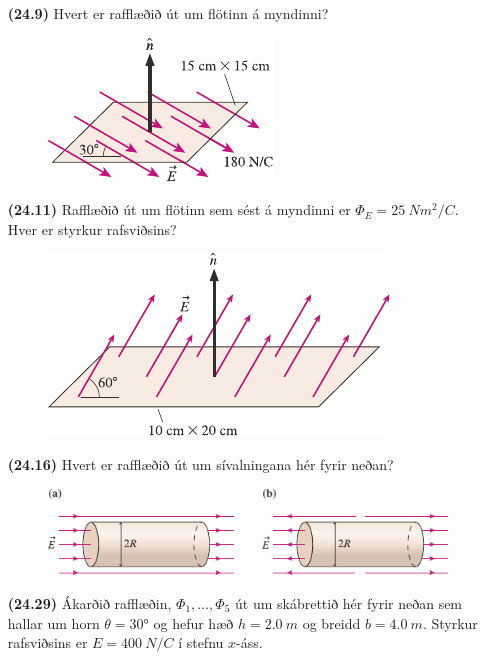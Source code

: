 \ifdefined \wholebook \else\documentclass[oneside]{book}\usepackage{EdlBook}\graphicspath{{figures/}}
\begin{document}
\begin{enumerate}[label = \textbf{(\alph*)}]

\item[\textbf{(24.9)}] Hvert er rafflæðið út um flötinn á myndinni?

\begin{figure}[H]
    \centering
    \includegraphics{figures/rk229.pdf}
\end{figure}

\item[\textbf{(24.11)}] Rafflæðið út um flötinn sem sést á myndinni er $\Phi_E = \SI{25}{Nm^2/C}$. Hver er styrkur rafsviðsins?

\begin{figure}[H]
    \centering
    \includegraphics[scale = 0.8]{figures/rk2411.pdf}
\end{figure}

\item[\textbf{(24.16)}] Hvert er rafflæðið út um sívalningana hér fyrir neðan?

\begin{figure}[H]
    \centering
    \includegraphics{figures/rk2416.pdf}
\end{figure}


\item[\textbf{(24.29)}] Ákarðið rafflæðin, $\Phi_1, \ldots, \Phi_5$ út um skábrettið hér fyrir neðan sem hallar um horn $\theta = \ang{30}$ og hefur hæð $h = \SI{2.0}{m}$ og breidd $b = \SI{4.0}{m}$. Styrkur rafsviðsins er $E = \SI{400}{N/C}$ í stefnu $x$-áss.


\end{enumerate}
\end{document}
